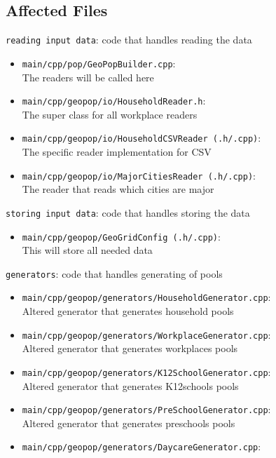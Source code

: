 \subsection{Affected Files}
\begin{compactitem}
	\item \texttt{reading input data}: code that handles reading the data
	\begin{itemize}
		\item \texttt{main/cpp/pop/GeoPopBuilder.cpp}: \\
		 The readers will be called here
		\item \texttt{main/cpp/geopop/io/HouseholdReader.h}: \\
		The super class for all workplace readers
		\item \texttt{main/cpp/geopop/io/HouseholdCSVReader (.h/.cpp)}: \\
		The specific reader implementation for CSV
		\item \texttt{main/cpp/geopop/io/MajorCitiesReader (.h/.cpp)}: \\
		The reader that reads which cities are major
	\end{itemize}
	\newpage
	\item \texttt{storing input data}: code that handles storing the data
	\begin{itemize}
		\item \texttt{main/cpp/geopop/GeoGridConfig (.h/.cpp)}: \\
		This will store all needed data
	\end{itemize}
	\item \texttt{generators}: code that handles generating of pools
	\begin{itemize}
		\item \texttt{main/cpp/geopop/generators/HouseholdGenerator.cpp}:\\
		Altered generator that generates household pools
		\item \texttt{main/cpp/geopop/generators/WorkplaceGenerator.cpp}:\\
		Altered generator that generates workplaces pools
		\item \texttt{main/cpp/geopop/generators/K12SchoolGenerator.cpp}:\\
		Altered generator that generates K12schools pools
		\item \texttt{main/cpp/geopop/generators/PreSchoolGenerator.cpp}:\\
		Altered generator that generates preschools pools
		\item \texttt{main/cpp/geopop/generators/DaycareGenerator.cpp}:\\

\end{itemize}
\end{compactitem}

